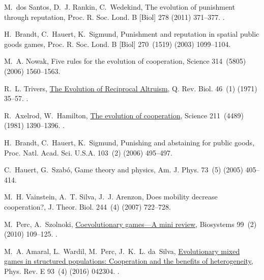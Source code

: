 \documentclass[5p]{elsarticle}
\begin{document}
\begin{thebibliography}{10}
M.~dos Santos, D.~J. Rankin, C.~Wedekind, {The evolution of punishment through
  reputation}, Proc. R. Soc. Lond. B [Biol] 278 (2011) 371--377.
\newblock \href {https://doi.org/10.1098/rspb.2010.1275}
  {}.

H.~Brandt, C.~Hauert, K.~Sigmund, Punishment and reputation in spatial public
  goods games, Proc. R. Soc. Lond. B [Biol] 270~(1519) (2003) 1099--1104.

M.~A. Nowak, Five rules for the evolution of cooperation, Science 314~(5805) (2006) 1560--1563.

R.~L. Trivers, \href{http://www.journals.uchicago.edu/doi/10.1086/406755}{{The
  Evolution of Reciprocal Altruism}}, Q. Rev. Biol. 46~(1) (1971) 35--57.
\newblock \href {https://doi.org/10.1086/406755} {}.

R.~Axelrod, W.~Hamilton,
  \href{http://science.sciencemag.org/content/211/4489/1390}{{The evolution of
  cooperation}}, Science 211~(4489) (1981) 1390--1396.
\newblock \href {https://doi.org/10.1126/science.7466396}
  {}.

H.~Brandt, C.~Hauert, K.~Sigmund, Punishing and abstaining for public goods,  Proc. Natl. Acad. Sci. U.S.A. 103~(2) (2006) 495--497.

C.~Hauert, G.~Szab{\'o}, Game theory and physics, Am. J. Phys.
  73~(5) (2005) 405--414.

M.~H. Vainstein, A.~T. Silva, J.~J. Arenzon, Does mobility decrease  cooperation?, J. Theor. Biol. 244~(4) (2007) 722--728.

M.~Perc, A.~Szolnoki,
  \href{http://www.sciencedirect.com/science/article/pii/S0303264709001646
  http://linkinghub.elsevier.com/retrieve/pii/S0303264709001646}{{Coevolutionary
  games—A mini review}}, Biosystems 99~(2) (2010) 109--125.
\newblock \href {https://doi.org/10.1016/j.biosystems.2009.10.003}
  {}.

M.~A. Amaral, L.~Wardil, M.~Perc, J.~K.~L. da~Silva,
  \href{http://link.aps.org/doi/10.1103/PhysRevE.93.042304}{{Evolutionary mixed
  games in structured populations: Cooperation and the benefits of
  heterogeneity}}, Phys. Rev. E 93~(4) (2016) 042304.
\newblock \href {https://doi.org/10.1103/PhysRevE.93.042304}
  {}.


\end{thebibliography}
\end{document}
